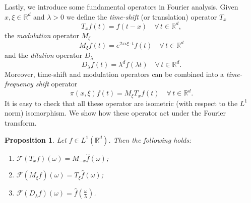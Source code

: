 \documentclass[corpo=11pt, stile=classica, tipotesi=custom,
greek, evenboxes, english]{toptesi}
\numberwithin{equation}{chapter}
\newtheorem{prop}[teo]{Proposition}
\theoremstyle{remark}
\newcommand{\R}{\mathbb{R}} %
\newcommand{\F}{\mathscr{F}} %
\begin{document}
Lastly, we introduce some fundamental operators in Fourier analysis. Given $x,\xi \in \R^d$ and $\lambda > 0$ we define the \emph{time-shift} (or translation) operator $T_x$
\begin{equation}\label{time-shift operator def}
	T_x f(t) = f(t-x) \quad \forall\, t \in \R^d,
\end{equation}
the \emph{modulation} operator $M_{\xi}$
\begin{equation}\label{modulation operator def}
	M_{\xi} f(t) = e^{2 \pi i \xi \cdot t} f(t) \quad \forall\, t \in \R^d
\end{equation}
and the \emph{dilation} operator $D_{\lambda}$
\begin{equation}\label{dilation operator def}
	D_{\lambda}f(t) = \lambda^d f(\lambda t) \quad \forall\, t \in \R^d.
\end{equation}
Moreover, time-shift and modulation operators can be combined into a \emph{time-frequency shift} operator
\begin{equation}\label{time-frequency shift def}
	\pi(x,\xi) f(t) = M_{\xi} T_x f(t) \quad \forall\, t \in \R^d.
\end{equation}
It is easy to check that all these operator are isometric (with respect to the $L^1$ norm) isomorphism. We show how these operator act under the Fourier transform.
\begin{prop}\label{properties of translation modulation and dilation operators}
	Let $f \in L^1(\R^d)$. Then the following holds:
	\begin{enumerate}[label=(\roman*)]
		\item $\displaystyle \F(T_xf)(\omega) = M_{-x}\hat{f}(\omega)$;\label{Fourier transform of translation}
		\item $\displaystyle \F(M_{\xi} f)(\omega) = T_{\xi} \hat{f}(\omega)$;\label{Fourier transform of modulation}
		\item $\displaystyle \F(D_{\lambda}f)(\omega) = \hat{f}\left(\frac{\omega}{\lambda}\right)$.\label{Fourier transform of dilation}
	\end{enumerate}
\end{prop}
\end{document}
